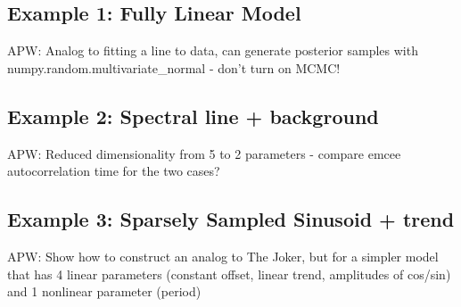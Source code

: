 \subsection{Example 1: Fully Linear Model}

APW: Analog to fitting a line to data, can generate posterior samples with numpy.random.multivariate\_normal - don't turn on MCMC!


\subsection{Example 2: Spectral line + background}

APW: Reduced dimensionality from 5 to 2 parameters - compare emcee autocorrelation time for the two cases?


\subsection{Example 3: Sparsely Sampled Sinusoid + trend}

APW: Show how to construct an analog to The Joker, but for a simpler model that has 4 linear parameters (constant offset, linear trend, amplitudes of cos/sin) and 1 nonlinear parameter (period)




